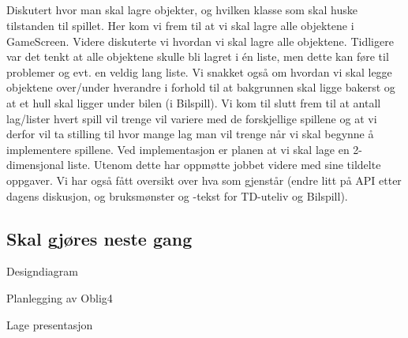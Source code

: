 \documentclass[11pt]{meetingmins}
\begin{document}
\maketitle
\subsection{}
Diskutert hvor man skal lagre objekter, og hvilken klasse som skal huske tilstanden til spillet. Her kom vi frem til at vi skal lagre alle objektene i GameScreen. Videre diskuterte vi hvordan vi skal lagre alle objektene. Tidligere var det tenkt at alle objektene skulle bli lagret i én liste, men dette kan føre til problemer og evt. en veldig lang liste. Vi snakket også om hvordan vi skal legge objektene over/under hverandre i forhold til at bakgrunnen skal ligge bakerst og at et hull skal ligger under bilen (i Bilspill). Vi kom til slutt frem til at antall lag/lister hvert spill vil trenge vil variere med de forskjellige spillene og at vi derfor vil ta stilling til hvor mange lag man vil trenge når vi skal begynne å implementere spillene. Ved implementasjon er planen at vi skal lage en 2-dimensjonal liste. Utenom dette har oppmøtte jobbet videre med sine tildelte oppgaver. Vi har også fått oversikt over hva som gjenstår (endre litt på API etter dagens diskusjon, og bruksmønster og -tekst for TD-uteliv og Bilspill).

\subsection{Skal gjøres neste gang}
\begin{items}
\item
Designdiagram
\item
Planlegging av Oblig4
\item
Lage presentasjon
\end{items}
\vspace{1em}
\end{document}
